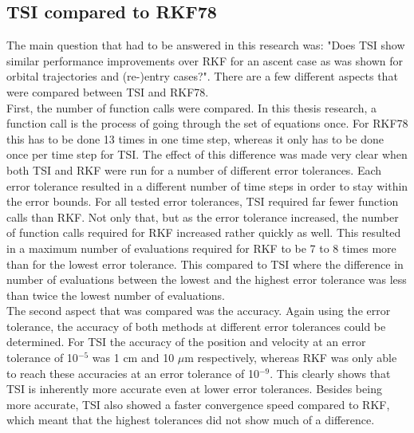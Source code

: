 



\subsection{\ac{TSI} compared to \ac{RKF78}}
\label{subsec:TSIcomparedToRKF78}
The main question that had to be answered in this research was: "Does \ac{TSI} show similar performance improvements over \ac{RKF} for an ascent case as was shown for orbital trajectories and (re-)entry cases?". There are a few different aspects that were compared between \ac{TSI} and \ac{RKF78}.\\
First, the number of function calls were compared. In this thesis research, a function call is the process of going through the set of equations once. For \ac{RKF78} this has to be done 13 times in one time step, whereas it only has to be done once per time step for \ac{TSI}. The effect of this difference was made very clear when both \ac{TSI} and \ac{RKF} were run for a number of different error tolerances. Each error tolerance resulted in a different number of time steps in order to stay within the error bounds. For all tested error tolerances, \ac{TSI} required far fewer function calls than \ac{RKF}. Not only that, but as the error tolerance increased, the number of function calls required for \ac{RKF} increased rather quickly as well. This resulted in a maximum number of evaluations required for \ac{RKF} to be 7 to 8 times more than for the lowest error tolerance. This compared to \ac{TSI} where the difference in number of evaluations between the lowest and the highest error tolerance was less than twice the lowest number of evaluations.\\
The second aspect that was compared was the accuracy. Again using the error tolerance, the accuracy of both methods at different error tolerances could be determined. For \ac{TSI} the accuracy of the position and velocity at an error tolerance of 10$^{-5}$ was 1 cm and 10 $\mu$m respectively, whereas \ac{RKF} was only able to reach these accuracies at an error tolerance of 10$^{-9}$. This clearly shows that \ac{TSI} is inherently more accurate even at lower error tolerances. Besides being more accurate, \ac{TSI} also showed a faster convergence speed compared to \ac{RKF}, which meant that the highest tolerances did not show much of a difference.\\
